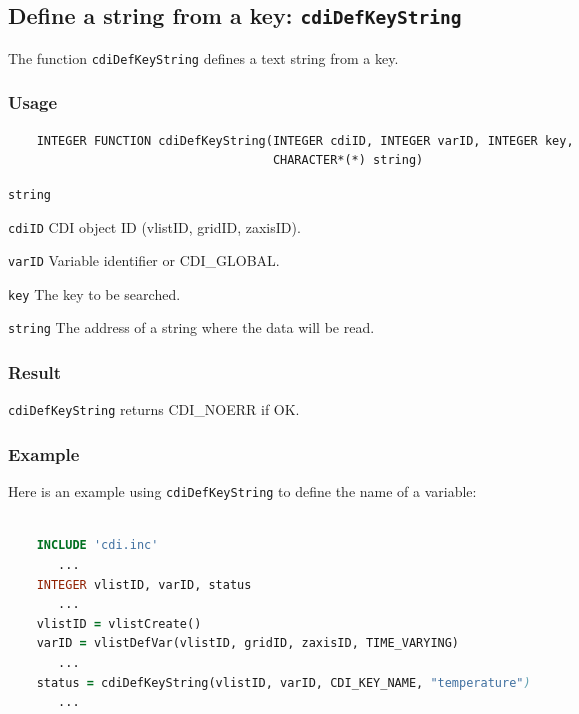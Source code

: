 

\subsection{Define a string from a key: \texttt{cdiDefKeyString}}
\label{cdiDefKeyString}

The function {\texttt{cdiDefKeyString}} defines a text string from a key.

\subsubsection*{Usage}

\begin{verbatim}
    INTEGER FUNCTION cdiDefKeyString(INTEGER cdiID, INTEGER varID, INTEGER key, 
                                     CHARACTER*(*) string)
\end{verbatim}

\hspace*{4mm}\begin{minipage}[]{15cm}
\begin{deflist}{\texttt{string}\ }
\item[\texttt{cdiID}]
CDI object ID (vlistID, gridID, zaxisID).
\item[\texttt{varID}]
Variable identifier or CDI\_GLOBAL.
\item[\texttt{key}]
The key to be searched.
\item[\texttt{string}]
The address of a string where the data will be read.

\end{deflist}
\end{minipage}

\subsubsection*{Result}

{\texttt{cdiDefKeyString}} returns CDI\_NOERR if OK.


\subsubsection*{Example}

Here is an example using {\texttt{cdiDefKeyString}} to define the name of a variable:

\begin{lstlisting}[language=Fortran, backgroundcolor=\color{pyellow}, basicstyle=\small, columns=flexible]

    INCLUDE 'cdi.inc'
       ...
    INTEGER vlistID, varID, status
       ...
    vlistID = vlistCreate()
    varID = vlistDefVar(vlistID, gridID, zaxisID, TIME_VARYING)
       ...
    status = cdiDefKeyString(vlistID, varID, CDI_KEY_NAME, "temperature")
       ...
\end{lstlisting}


